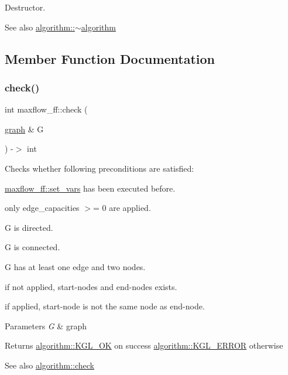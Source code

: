 Destructor.

\begin{DoxySeeAlso}{See also}
\mbox{\hyperlink{classalgorithm_adca9b1e7fa3afd914519a9dbb44e9fd5}{algorithm\+::$\sim$algorithm}} 
\end{DoxySeeAlso}


\subsection{Member Function Documentation}
\mbox{\label{classmaxflow__ff_ac1ae43b4e24d9b433892c073c8b244d3}} 
\subsubsection{\texorpdfstring{check()}{check()}}
{\footnotesize\ttfamily int maxflow\+\_\+ff\+::check (\begin{DoxyParamCaption}\item[{\mbox{\hyperlink{classgraph}{graph}} \&}]{G }\end{DoxyParamCaption}) -\/$>$ int\hspace{0.3cm}{\ttfamily [virtual]}}

Checks whether following preconditions are satisfied\+: 
\begin{DoxyItemize}
\item \mbox{\hyperlink{classmaxflow__ff_ad2485a4c093dbcfa045d1e6e5d78f533}{maxflow\+\_\+ff\+::set\+\_\+vars}} has been executed before. 
\item only edge\+\_\+capacities $>$= 0 are applied. 
\item {\ttfamily G} is directed. 
\item {\ttfamily G} is connected. 
\item {\ttfamily G} has at least one edge and two nodes. 
\item if not applied, start-\/nodes and end-\/nodes exists. 
\item if applied, start-\/node is not the same node as end-\/node. 
\end{DoxyItemize}


\begin{DoxyParams}{Parameters}
{\em G} & graph \\
\hline
\end{DoxyParams}
\begin{DoxyReturn}{Returns}
{\ttfamily \mbox{\hyperlink{classalgorithm_af1a0078e153aa99c24f9bdf0d97f6710aae4c1cd7fe8d8cf4b143241a6e7c31cf}{algorithm\+::\+K\+G\+L\+\_\+\+OK}}} on success {\ttfamily \mbox{\hyperlink{classalgorithm_af1a0078e153aa99c24f9bdf0d97f6710ae67bf27b2ef31f73e545a7f9f4a69556}{algorithm\+::\+K\+G\+L\+\_\+\+E\+R\+R\+OR}}} otherwise 
\end{DoxyReturn}
\begin{DoxySeeAlso}{See also}
\mbox{\hyperlink{classalgorithm_a05c0f25463eb35a77b2d73fc06bb2c0e}{algorithm\+::check}} 
\end{DoxySeeAlso}


